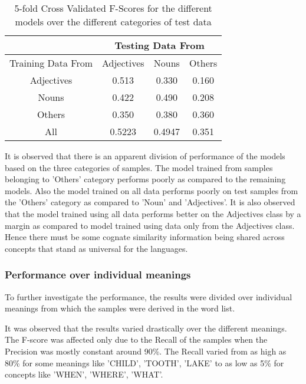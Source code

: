 \documentclass[journal]{IEEEtran}
\begin{document}
\begin{table}[h]
\centering
\caption{5-fold Cross Validated F-Scores for the different models over the different categories of test data}
\begin{tabular}{c|c|c|c|}
\cline{2-4}
                                         & \multicolumn{3}{c|}{Testing Data From} \\ \hline
\multicolumn{1}{|c|}{Training Data From} & Adjectives     & Nouns     & Others    \\ \hline
\multicolumn{1}{|c|}{Adjectives}         & 0.513          & 0.330     & 0.160     \\ \hline
\multicolumn{1}{|c|}{Nouns}              & 0.422          & 0.490     & 0.208     \\ \hline
\multicolumn{1}{|c|}{Others}             & 0.350          & 0.380     & 0.360     \\ \hline
\multicolumn{1}{|c|}{All}                & 0.5223         & 0.4947    & 0.351     \\ \hline
\end{tabular}
\end{table}

It is observed that there is an apparent division of performance of the models based on the three categories of samples. The model trained from samples belonging to 'Others' category performs poorly as compared to the remaining models. Also the model trained on all data performs poorly on test samples from the 'Others' category as compared to 'Noun' and 'Adjectives'. It is also observed that the model trained using all data performs better on the Adjectives class by a margin as compared to model trained using data only from the Adjectives class. Hence there must be some cognate similarity information being shared across concepts that stand as universal for the languages.

\subsubsection{Performance over individual meanings}

To further investigate the performance, the results were divided over individual meanings from which the samples were derived in the word list. 

It was observed that the results varied drastically over the different meanings. The F-score was affected only due to the Recall of the samples when the Precision was mostly constant around 90\%. The Recall varied from as high as 80\% for some meanings like 'CHILD', 'TOOTH', 'LAKE' to as low as 5\% for concepts like 'WHEN', 'WHERE', 'WHAT'. 
\end{document}

